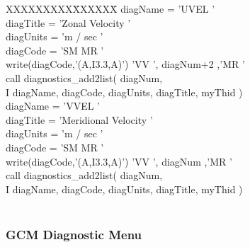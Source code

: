 \noindent
\begin{tabbing}
XXXXXXXXX\=XXXXXX\= \kill
\>      diagName  = 'UVEL    ' \\
\>      diagTitle = 'Zonal Velocity                ' \\
\>      diagUnits = 'm / sec         ' \\
\>      diagCode  = 'SM      MR      ' \\
\>      write(diagCode,'(A,I3.3,A)') 'VV   ', diagNum+2 ,'MR      ' \\
\>      call diagnostics\_add2list( diagNum, \\
\>     I          diagName, diagCode, diagUnits, diagTitle, myThid ) \\
\>      diagName  = 'VVEL    ' \\
\>      diagTitle = 'Meridional Velocity           ' \\
\>      diagUnits = 'm / sec         ' \\
\>      diagCode  = 'SM      MR      ' \\
\>      write(diagCode,'(A,I3.3,A)') 'VV   ', diagNum ,'MR      ' \\
\>      call diagnostics\_add2list( diagNum, \\
\>     I          diagName, diagCode, diagUnits, diagTitle, myThid ) \\
\\
\end{tabbing}


\newpage

\subsubsection{GCM Diagnostic Menu}
\label{sec:diagnostics:menu}

